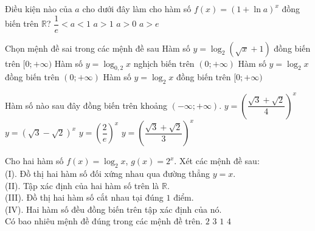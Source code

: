 \begin{ex}%
	Điều kiện nào của $a$ cho dưới đây làm cho hàm số $f(x)=(1+\ln a)^x$ đồng biến trên $\mathbb{R}$?
	\choice
	{$\dfrac{1}{e}<a<1$}
	{\True $a>1$}
	{$a>0$}
	{$a>e$}
\end{ex}
\begin{ex}%
	Chọn mệnh đề sai trong các mệnh đề sau
	\choice
	{Hàm số $y=\log_2(\sqrt{x}+1)$ đồng biến trên $[0;+\infty)$}
	{Hàm số $y=\log_{0,2}x$ nghịch biến trên $(0;+\infty)$}
	{Hàm số $y=\log_2x$ đồng biến trên $(0;+\infty)$}
	{\True Hàm số $y=\log_2x$ đồng biến trên $[0;+\infty)$}
	\loigiai{
		Hàm số $y=\log_2x$ có tập xác định $\mathscr{D}=(0;+\infty)$ nên không đồng biến trên $[0;+\infty)$.}
\end{ex}
\begin{ex}%
	Hàm số nào sau đây đồng biến trên khoảng $(-\infty;+\infty)$. 
	\choice
	{$y=\left(\dfrac{\sqrt{3}+\sqrt{2}}{4}\right)^x$}
	{$y=\left(\sqrt{3}-\sqrt{2}\right)^x$}
	{$y=\left(\dfrac{2}{e}\right)^x$}
	{\True $y=\left(\dfrac{\sqrt{3}+\sqrt{2}}{3}\right)^x$}
\end{ex}
\begin{ex}%
	Cho hai hàm số $f(x)=\log_2x$, $g(x)=2^x$. Xét các mệnh đề sau:\\
	(I). Đồ thị hai hàm số đối xứng nhau qua đường thẳng $y=x$.\\
	(II). Tập xác định của hai hàm số trên là $\mathbb{R}$.\\
	(III). Đồ thị hai hàm số cắt nhau tại đúng $1$ điểm.\\
	(IV). Hai hàm số đều đồng biến trên tập xác định của nó.\\
	Có bao nhiêu mệnh đề đúng trong các mệnh đề trên. 
	\choice
	{\True $2$}
	{$3$}
	{$1$}
	{$4$}
\end{ex}
